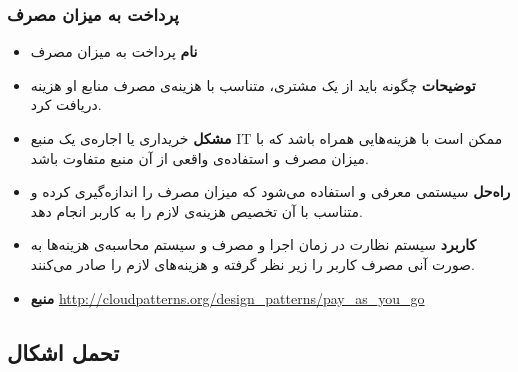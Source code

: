 \subsubsection{پرداخت به میزان مصرف}
\begin{itemize}
\item \textbf{نام} \newline
پرداخت به میزان مصرف 
\item \textbf{توضیحات} \newline
چگونه باید از یک مشتری، متناسب با هزینه‌ی مصرف منابع او  هزینه دریافت کرد.
\item \textbf{مشکل} \newline
خریداری یا اجاره‌ی یک منبع IT ممکن است با هزینه‌هایی همراه باشد که با میزان مصرف و استفاده‌ی واقعی از آن منبع  متفاوت باشد.
\item \textbf{راه‌حل} \newline
سیستمی معرفی و استفاده می‌شود که میزان مصرف را اندازه‌گیری کرده و متناسب با آن تخصیص هزینه‌ی لازم را به کاربر انجام دهد.
\item \textbf{کاربرد} \newline
سیستم نظارت در زمان اجرا و مصرف و سیستم محاسبه‌ی هزینه‌ها به صورت آنی مصرف کاربر را زیر نظر گرفته و هزینه‌های لازم را صادر می‌کنند.
\item \textbf{منبع} \newline
\url{http://cloudpatterns.org/design_patterns/pay_as_you_go}
\end{itemize}


\subsection{تحمل اشکال}


